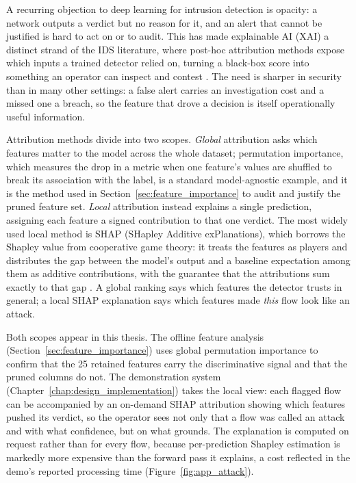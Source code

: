 \par A recurring objection to deep learning for intrusion detection is opacity: a network outputs a verdict but no reason for it, and an alert that cannot be justified is hard to act on or to audit. This has made explainable AI (XAI) a distinct strand of the IDS literature, where post-hoc attribution methods expose which inputs a trained detector relied on, turning a black-box score into something an operator can inspect and contest \cite{Almohri2024XAI}. The need is sharper in security than in many other settings: a false alert carries an investigation cost and a missed one a breach, so the feature that drove a decision is itself operationally useful information.

\par Attribution methods divide into two scopes. \emph{Global} attribution asks which features matter to the model across the whole dataset; permutation importance, which measures the drop in a metric when one feature's values are shuffled to break its association with the label, is a standard model-agnostic example, and it is the method used in Section~\ref{sec:feature_importance} to audit and justify the pruned feature set. \emph{Local} attribution instead explains a single prediction, assigning each feature a signed contribution to that one verdict. The most widely used local method is SHAP (SHapley Additive exPlanations), which borrows the Shapley value from cooperative game theory: it treats the features as players and distributes the gap between the model's output and a baseline expectation among them as additive contributions, with the guarantee that the attributions sum exactly to that gap \cite{Lundberg2017}. A global ranking says which features the detector trusts in general; a local SHAP explanation says which features made \emph{this} flow look like an attack.

\par Both scopes appear in this thesis. The offline feature analysis (Section~\ref{sec:feature_importance}) uses global permutation importance to confirm that the 25 retained features carry the discriminative signal and that the pruned columns do not. The demonstration system (Chapter~\ref{chap:design_implementation}) takes the local view: each flagged flow can be accompanied by an on-demand SHAP attribution showing which features pushed its verdict, so the operator sees not only that a flow was called an attack and with what confidence, but on what grounds. The explanation is computed on request rather than for every flow, because per-prediction Shapley estimation is markedly more expensive than the forward pass it explains, a cost reflected in the demo's reported processing time (Figure~\ref{fig:app_attack}).

